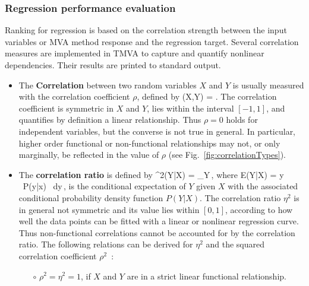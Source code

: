 \subsubsection{Regression performance evaluation}

Ranking for regression is based on the correlation strength between
the input variables or MVA method response and the regression
target. Several correlation measures are implemented in TMVA to
capture and quantify nonlinear dependencies. Their results are printed
to standard output.
\begin{itemize}

\item The {\bf Correlation} between two random variables $X$ and $Y$ is 
      usually measured with the correlation coefficient $\rho$, defined by 
      \beq
      \label{eqn:corrCoeff}
         \rho(X,Y) = .  \eeq
         The correlation coefficient is symmetric in $X$ and $Y$, lies
         within the interval $[-1,1]$, and quantifies by definition a
         linear relationship. Thus $\rho = 0$ holds for independent
         variables, but the converse is not true in general. In
         particular, higher order functional or non-functional
         relationships may not, or only marginally, be reflected in
         the value of $\rho$ (see Fig.~\ref{fig:correlationTypes}).

\item The {\bf correlation ratio} is defined by
      \beq
      \label{eqn:corrRatio}
         \eta^2(Y|X) =  {\sigma_Y}\,,
      \eeq
      where
      \beq
      \label{eqn:condExp}
         E(Y|X) = \int y \ P(y|x) \ dy\,, \eeq is the conditional
         expectation of $Y$ given $X$ with the associated conditional
         probability density function $P(Y|X)$. The correlation ratio
         $\eta^2$ is in general not symmetric and its value lies
         within $[0,1]$, according to how well the data points can be
         fitted with a linear or nonlinear regression curve. Thus
         non-functional correlations cannot be accounted for by the
         correlation ratio. The following relations can be derived for
         $\eta^2$ and the squared correlation coefficient
         $\rho^2$~\cite{kendall:stuart:ord:arnold:1999:2A}:
      \begin{itemize}

      \item[$\circ$] $\rho^2 = \eta^2=1$, if $X$ and $Y$ are in a
        strict linear functional relationship.


\end{itemize}
\end{itemize}
